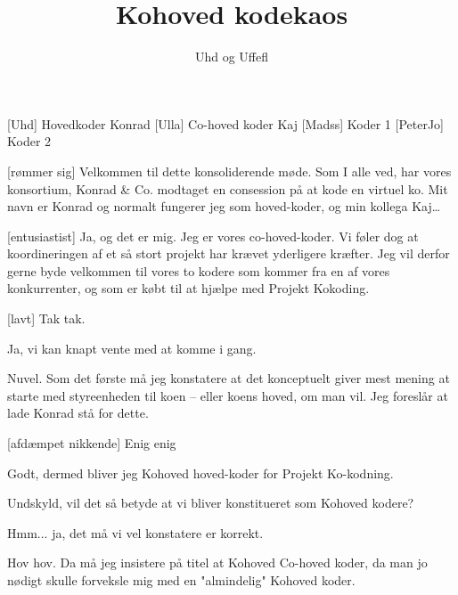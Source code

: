 \documentclass[a4paper,11pt]{article}
\title{Kohoved kodekaos}
\author{Uhd og Uffefl}
\begin{document}
\maketitle
  
\begin{roles}
[Uhd] Hovedkoder Konrad
[Ulla] Co-hoved koder Kaj
[Madss] Koder 1
[PeterJo] Koder 2
\end{roles}

\begin{props}
\end{props}

\begin{sketch}

[rømmer sig] Velkommen til dette konsoliderende møde. Som I alle ved,
har vores konsortium, Konrad \& Co. modtaget en consession på at kode en virtuel
ko. Mit navn er Konrad og normalt fungerer jeg som hoved-koder, og min kollega
Kaj\ldots

[entusiastist] Ja, og det er mig. Jeg er vores co-hoved-koder. Vi føler
dog at koordineringen af et så stort projekt har krævet yderligere kræfter. Jeg
vil derfor gerne byde velkommen til vores to kodere  som
kommer fra en af vores konkurrenter, og som er købt til at hjælpe med Projekt
Kokoding.

[lavt] Tak tak.

 Ja, vi kan knapt vente med at komme i gang.

 Nuvel. Som det første må jeg konstatere at det konceptuelt giver mest
mening at starte med styreenheden til koen -- eller koens hoved, om man vil. Jeg
foreslår at lade Konrad stå for dette.

[afdæmpet nikkende] Enig enig

 Godt, dermed bliver jeg Kohoved hoved-koder for Projekt 
Ko-kodning.

 Undskyld, vil det så betyde at vi  
bliver konstitueret som Kohoved kodere?

 Hmm... ja, det må vi vel konstatere er korrekt.

 Hov hov. Da må jeg insistere på titel at Kohoved Co-hoved 
koder, da man jo nødigt skulle forveksle mig med en  
"almindelig" Kohoved koder.


\end{sketch}
\end{document}
